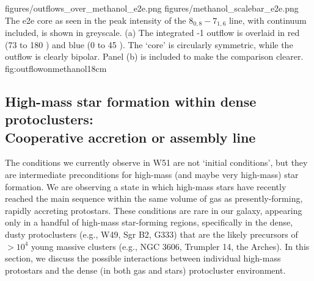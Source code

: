 \documentclass{emulateapj}
\begin{document}
 
\FigureTwo
{figures/outflows_over_methanol_e2e.png}
{figures/methanol_scalebar_e2e.png}
{The e2e core as seen in the peak intensity of the \methanol $8_{0,8}-7_{1,6}$
line, with continuum included, is shown in greyscale.
(a) The integrated -1 outflow is overlaid in red (73 to 180 \kms)
and blue (0 to 45 \kms).  The `core' is circularly symmetric, while the outflow
is clearly bipolar. Panel (b) is included to make the comparison clearer.}
{fig:outflowonmethanol}{1}{8cm}


\subsection{High-mass star formation within dense protoclusters:\\
Cooperative accretion or assembly line}
\label{sec:cooperative}
The conditions we currently observe in W51 are not `initial conditions', but
they are intermediate preconditions for high-mass (and maybe very high-mass)
star formation.  We are observing a state in which high-mass stars have
recently reached the main sequence within the same volume of gas as
presently-forming, rapidly accreting protostars.  These conditions are rare in
our galaxy, appearing only in a handful of high-mass star-forming regions,
specifically in the dense, dusty protoclusters (e.g., W49, Sgr B2, G333) that
are the likely precursors of $>10^4$ \msun young massive clusters (e.g., NGC
3606, Trumpler 14, the Arches).  In this section, we discuss the possible
interactions between individual high-mass protostars and the dense (in both gas
and stars) protocluster environment.

\end{document}
